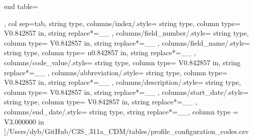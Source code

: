 \begin{landscape}
\begin{longtable}
    end table=\end{longtable},
    col sep=tab,
    string type,
    columns/index/.style={
            string type, 
            column type= V{0.842857 in}, 
            string replace*={_}{\_}
        },
    columns/field_number/.style={
            string type, 
            column type= V{0.842857 in}, 
            string replace*={_}{\_}
        },
    columns/field_name/.style={
            string type, 
            column type= n{0.842857 in}, 
            string replace*={_}{\_}
        },
    columns/code_value/.style={
            string type, 
            column type= V{0.842857 in}, 
            string replace*={_}{\_}
        },
    columns/abbreviation/.style={
            string type, 
            column type= V{0.842857 in}, 
            string replace*={_}{\_}
        },
    columns/description/.style={
            string type, 
            column type= V{0.842857 in}, 
            string replace*={_}{\_}
        },
    columns/start_date/.style={
            string type, 
            column type= V{0.842857 in}, 
            string replace*={_}{\_}
        },
    columns/end_date/.style={
            string type, 
            string replace*={_}{\_},
            column type = V{3.000000 in}
        }
    ]{/Users/dyb/GitHub/C3S_311a_CDM/tables/profile_configuration_codes.csv}
\end{landscape}
